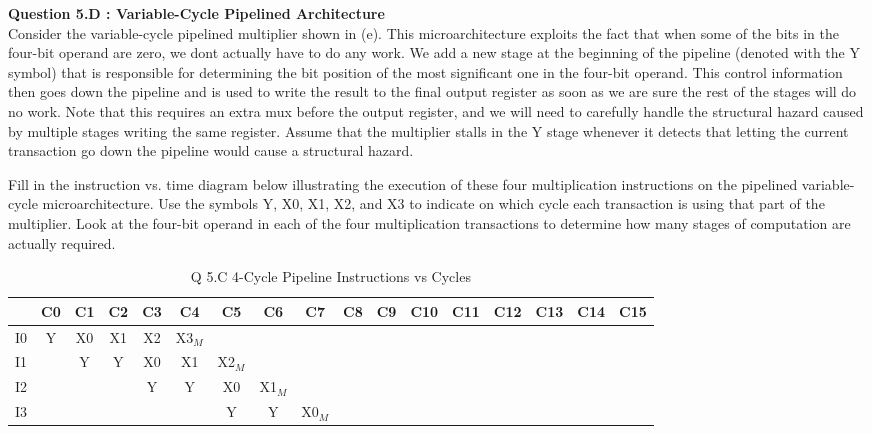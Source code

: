 \documentclass[a4paper,11pt]{article}
\begin{document}
\item \textbf{Question 5.D : Variable-Cycle Pipelined Architecture} \\ 
  Consider the variable-cycle pipelined multiplier shown in (e). This microarchitecture exploits the fact that when some of the bits in the four-bit operand are zero, we dont actually have to do any work. We add a new stage at the beginning of the pipeline (denoted with the Y symbol) that is responsible for determining the bit position of the most significant one in the four-bit operand. This control information then goes down the pipeline and is used to write the result to the final output register as soon as we are sure the rest of the stages will do no work. Note that this requires an extra mux before the output register, and we will need to carefully handle the structural hazard caused by multiple stages writing the same register. Assume that the multiplier stalls in the Y stage whenever it detects that letting the current transaction go down the pipeline would cause a structural hazard.

Fill in the instruction vs. time diagram below illustrating the execution of these four multiplication instructions on the pipelined variable-cycle microarchitecture. Use the symbols Y, X0, X1, X2, and X3 to indicate on which cycle each transaction is using that part of the multiplier. Look at the four-bit operand in each of the four multiplication transactions to determine how many stages of computation are actually required.

\begin{table}[H]
\caption{Q 5.C 4-Cycle Pipeline Instructions vs Cycles}
\begin{center}
\begin{tabular}{|c|c|c|c|c|c|c|c|c|c|c|c|c|c|c|c|c|} \hline
     & C0 & C1 & C2 & C3 & C4     & C5      & C6     & C7     & C8 & C9 & C10 & C11 & C12 & C13 & C14 & C15  \\ \hline
  I0 & Y  & X0 & X1 & X2 & X3$_M$ &         &        &        &    &     &     &     &     &     &    &      \\ \hline   
  I1 &    & Y  & Y  & X0 & X1     & X2$_M$  &        &        &    &     &     &     &     &     &    &      \\ \hline   
  I2 &    &    &    & Y  & Y      & X0      & X1$_M$ &        &    &     &     &     &     &     &    &      \\ \hline   
  I3 &    &    &    &    &        & Y       &  Y     & X0$_M$ &    &     &     &     &     &     &    &      \\ \hline   
\end{tabular}
\end{center}
\end{table}
\end{document}

